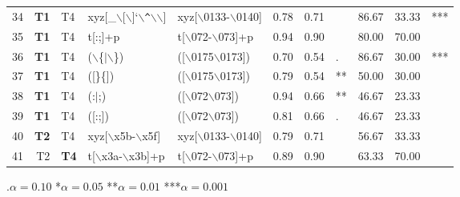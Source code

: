 \begin{table*}[ht]
\begin{tabular}{rr@{ -- }lllrrlrrl}
  34 & {\bf T1} & T4 & xyz[\_$\backslash$[$\backslash$]`$\backslash$\verb|^|$\backslash$$\backslash$] & xyz[$\backslash$0133-$\backslash$0140] & 0.78 & 0.71 &   & 86.67 & 33.33 & *** \\ 

  35 & {\bf T1} & T4 & t[:;]+p & t[$\backslash$072-$\backslash$073]+p & 0.94 & 0.90 &   & 80.00 & 70.00 &   \\ 
  
  36 & {\bf T1} & T4 & ($\backslash$\{$|$$\backslash$\}) & ([$\backslash$0175$\backslash$0173]) & 0.70 & 0.54 & . & 86.67 & 30.00 & *** \\ 
  37 & {\bf T1} & T4 & ([\}\{]) & ([$\backslash$0175$\backslash$0173]) & 0.79 & 0.54 & ** & 50.00 & 30.00 &   \\ 
  38 & {\bf T1} & T4 & (:$|$;) & ([$\backslash$072$\backslash$073]) & 0.94 & 0.66 & ** & 46.67 & 23.33 &   \\ 
  39 & {\bf T1} & T4 & ([:;]) & ([$\backslash$072$\backslash$073]) & 0.81 & 0.66 & . & 46.67 & 23.33 &   \\ 
  
  40 & {\bf T2} & T4 & xyz[$\backslash$x5b-$\backslash$x5f] & xyz[$\backslash$0133-$\backslash$0140] & 0.79 & 0.71 &   & 56.67 & 33.33 &   \\ 
  41 & T2 & {\bf T4} & t[$\backslash$x3a-$\backslash$x3b]+p & t[$\backslash$072-$\backslash$073]+p & 0.89 & 0.90 &   & 63.33 & 70.00 &   \\ 
   \hline
\end{tabular}

\vspace{3pt}
.$\alpha = 0.10$ \hspace{3pt} *$\alpha=0.05$ \hspace{3pt} **$\alpha=0.01$ \hspace{3pt} ***$\alpha=0.001$
\end{table*}
